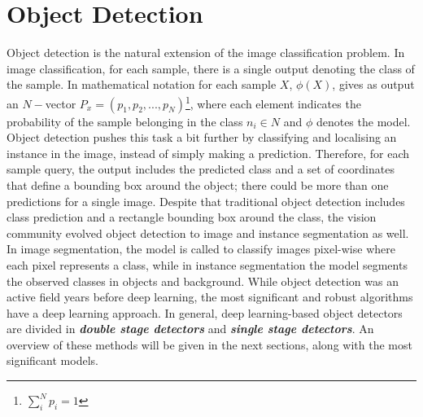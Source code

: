 \chapter{Object Detection} \label{Chapter:ObjectDetection}

Object detection is the natural extension of the image classification problem. In image classification, for each sample, there is a single output denoting the class of the sample. In mathematical notation for each sample $X$, $\phi(X)$, gives as output an $N-$vector $P_x=(p_1,p_2,...,p_N)$\footnote{$\sum^N_i p_i=1$}, where each element indicates the probability of the sample belonging in the class $n_i \in N$ and $\phi$ denotes the model. Object detection pushes this task a bit further by classifying and localising an instance in the image, instead of simply making a prediction. Therefore, for each sample query, the output includes the predicted class and a set of coordinates that define a bounding box around the object; there could be more than one predictions for a single image. Despite that traditional object detection includes class prediction and a rectangle bounding box around the class, the vision community evolved object detection to image and instance segmentation as well. In image segmentation, the model is called to classify images pixel-wise where each pixel represents a class, while in instance segmentation the model segments the observed classes in objects and background. While object detection was an active field years before deep learning, the most significant and robust algorithms have a deep learning approach. In general, deep learning-based object detectors are divided in \textbf{\textit{double stage detectors}} and \textbf{\textit{single stage detectors}}. An overview of these methods will be given in the next sections, along with the most significant models. 

